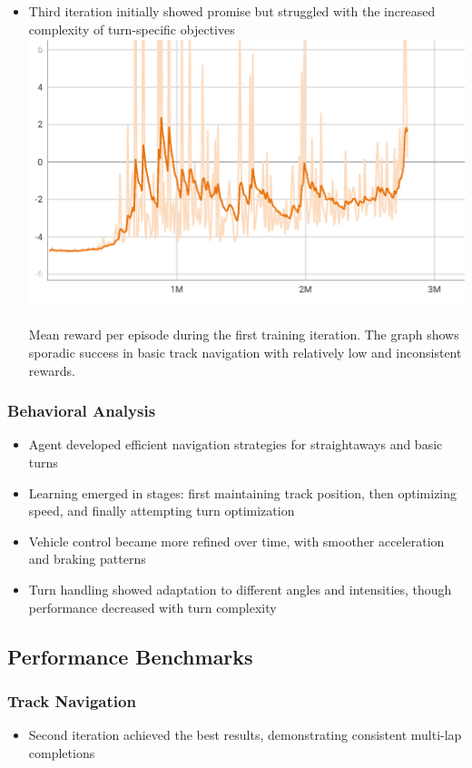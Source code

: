 \documentclass[10pt,twocolumn]{article}
\begin{document}
\begin{itemize}
\item Third iteration initially showed promise but struggled with the increased complexity of turn-specific objectives
\includegraphics[scale=.75]{run3}
\caption{Mean reward per episode during the first training iteration. The graph shows sporadic success in basic track navigation with relatively low and inconsistent rewards.}
\label{fig:run3-mean-reward}

\end{itemize}
\subsubsection{Behavioral Analysis}
\begin{itemize}
\item Agent developed efficient navigation strategies for straightaways and basic turns
\item Learning emerged in stages: first maintaining track position, then optimizing speed, and finally attempting turn optimization
\item Vehicle control became more refined over time, with smoother acceleration and braking patterns
\item Turn handling showed adaptation to different angles and intensities, though performance decreased with turn complexity
\end{itemize}
\subsection{Performance Benchmarks}
\subsubsection{Track Navigation}
\begin{itemize}
\item Second iteration achieved the best results, demonstrating consistent multi-lap completions
\end{itemize}
\end{document}
